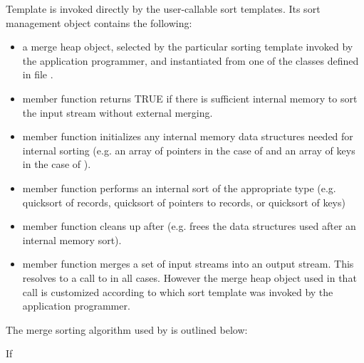\noindent
Template  is invoked directly by
the user-callable sort templates. Its sort management object
 contains the following:
\begin{itemize}
    \item a merge heap object, selected by the particular
    sorting template invoked by the application programmer,
    and instantiated from one of the classes defined in file
    .
    
    \item member function 
    returns TRUE if there is sufficient internal memory to
    sort the input stream without external merging.

    \item member function 
    initializes any internal memory data structures needed
    for internal sorting (e.g. an array of pointers in the
    case of  and an array of keys in the case
    of ).

    \item member function  performs
    an internal sort of the appropriate type (e.g. quicksort
    of records, quicksort of pointers to records, or
    quicksort of keys)
    
    \item member function 
    cleans up after  (e.g. frees the
    data structures used after an internal memory sort).

    \item member function  merges a set
    of input streams into an output stream. This resolves
    to a call to  in all
    cases. However the merge heap object used in that call
    is customized according to which sort template was invoked by
    the application programmer.
  
\end{itemize} 

The merge sorting algorithm used by
 is outlined below:

 {If 
     {  }
     {  }
     {  }}

